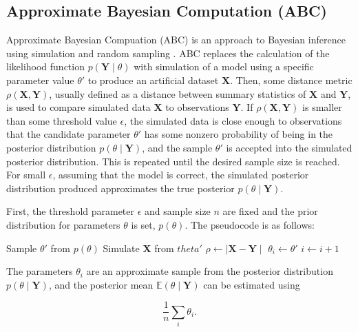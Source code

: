 \subsection{Approximate Bayesian Computation
(ABC)}
 Approximate Bayesian Compuation (ABC) is an approach to Bayesian
inference using
 simulation and random sampling \cite{Beaumont2002,
Sisson2010}.
 ABC replaces the calculation
 of the likelihood function
$p(\bm{Y}
\mid \theta)$ with simulation of a model using a specific parameter
value
$\theta'$ to produce an artificial dataset
 $\bm{X}$. Then, some
distance metric
$\rho (\bm{X}, \bm{Y}) $, usually defined
 as a distance
between summary
statistics of $\bm{X}$ and $\bm{Y}$, is used to
 compare
simulated data $\bm{X}$
to observations $\bm{Y}$. If $\rho (\bm{X},
 \bm{Y}) $
is smaller than some
threshold value $\epsilon$, the simulated data is
 close
enough to observations
that the candidate parameter $\theta'$ has some
nonzero probability of being in
the posterior distribution $ p(\theta \mid \bm{Y})$, and the sample $\theta'$
is accepted into the simulated posterior
distribution. This is repeated until
the desired sample size is reached. For
small $\epsilon$, assuming that the
model is correct, the simulated posterior
distribution produced approximates
the
 true posterior $ p(\theta \mid
\bm{Y})$.

 First, the threshold parameter
$\epsilon$ and sample size $n$
are fixed and the
 prior distribution for
parameters $\theta$ is
set, $p(\theta)$. The pseudocode is as
follows:
 \begin{algorithmic}
     \State Sample $\theta'$ from $p(\theta)$
     \State Simulate $\bm{X}$ from $theta'$
     \State $\rho \gets \mid \bm{X} - \bm{Y} \mid$
\If {$\rho < \epsilon$}
  \State $\theta_i \gets \theta'$
  \State $i \gets i + 1$
\EndIf
\EndWhile
 \end{algorithmic}
The parameters $\theta_i$ are an approximate sample from the posterior distribution $p(\theta \mid \bm{Y})$, and the posterior mean $\mathbb{E}(\theta \mid \bm{Y})$ can be estimated using

\begin{equation}
\frac{1}{n} \sum_i \theta_i .
\end{equation}

